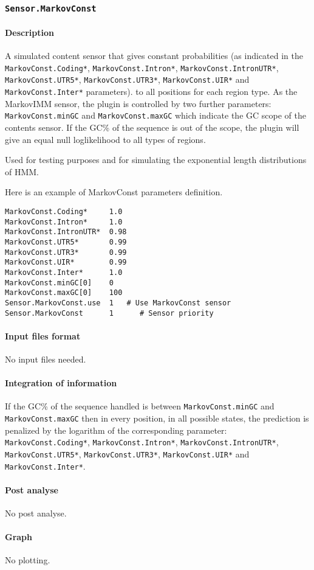 
\subsubsection{\texttt{Sensor.MarkovConst}}

\paragraph{Description}

A simulated content sensor that gives constant probabilities (as
indicated in the \texttt{MarkovConst\-.Coding*},
\texttt{MarkovConst.Intron*}, \texttt{MarkovConst.IntronUTR*},
\texttt{MarkovConst.UTR5*}, \texttt{Mark\-ovConst.UTR3*},
\texttt{MarkovConst.UIR*} and \texttt{MarkovConst.Inter*} parameters).
to all positions for each region type. As the MarkovIMM sensor, the
plugin is controlled by two further parameters:
\texttt{MarkovConst.minGC} and \texttt{MarkovConst.maxGC} which
indicate the GC scope of the contents sensor. If the GC\% of the
sequence is out of the scope, the plugin will give an equal null
loglikelihood to all types of regions.

Used for testing purposes and for simulating the exponential length
distributions of HMM.

Here is an example of MarkovConst parameters definition.
\begin{Verbatim}[fontsize=\small]
MarkovConst.Coding*     1.0
MarkovConst.Intron*     1.0
MarkovConst.IntronUTR*  0.98
MarkovConst.UTR5*       0.99
MarkovConst.UTR3*       0.99
MarkovConst.UIR*        0.99
MarkovConst.Inter*      1.0
MarkovConst.minGC[0]    0
MarkovConst.maxGC[0]    100
Sensor.MarkovConst.use  1   # Use MarkovConst sensor
Sensor.MarkovConst      1      # Sensor priority
\end{Verbatim}

\paragraph{Input files format}

No input files  needed.

\paragraph{Integration of information}

If the GC\% of the sequence handled is between
\texttt{MarkovConst.minGC} and \texttt{MarkovConst.maxGC} then in
every position, in all possible states, the prediction is penalized by
the logarithm of the corresponding parameter:
\texttt{MarkovConst.Coding*}, \texttt{MarkovConst.Intron*},
\texttt{MarkovConst.IntronUTR*}, \texttt{MarkovConst.UTR5*},
\texttt{MarkovConst.UTR3*}, \texttt{MarkovConst.UIR*} and
\texttt{MarkovConst.Inter*}.

\paragraph{Post analyse}

No post analyse.

\paragraph{Graph}

No plotting.

